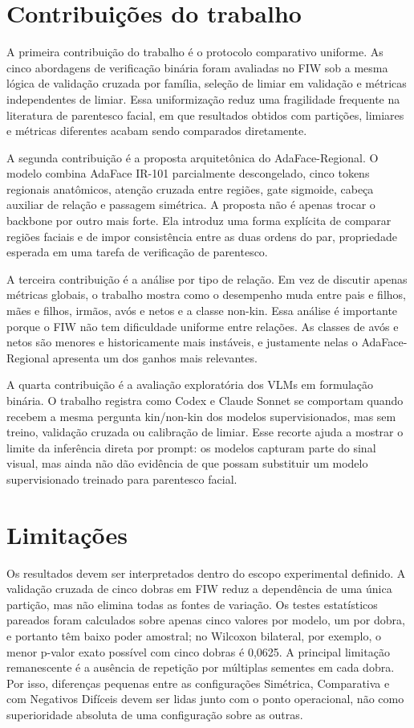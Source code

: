 \section{Contribuições do trabalho}

A primeira contribuição do trabalho é o protocolo comparativo uniforme. As cinco abordagens de verificação binária foram avaliadas no FIW sob a mesma lógica de validação cruzada por família, seleção de limiar em validação e métricas independentes de limiar. Essa uniformização reduz uma fragilidade frequente na literatura de parentesco facial, em que resultados obtidos com partições, limiares e métricas diferentes acabam sendo comparados diretamente.

A segunda contribuição é a proposta arquitetônica do AdaFace-Regional. O modelo combina AdaFace IR-101 parcialmente descongelado, cinco tokens regionais anatômicos, atenção cruzada entre regiões, gate sigmoide, cabeça auxiliar de relação e passagem simétrica. A proposta não é apenas trocar o backbone por outro mais forte. Ela introduz uma forma explícita de comparar regiões faciais e de impor consistência entre as duas ordens do par, propriedade esperada em uma tarefa de verificação de parentesco.

A terceira contribuição é a análise por tipo de relação. Em vez de discutir apenas métricas globais, o trabalho mostra como o desempenho muda entre pais e filhos, mães e filhos, irmãos, avós e netos e a classe non-kin. Essa análise é importante porque o FIW não tem dificuldade uniforme entre relações. As classes de avós e netos são menores e historicamente mais instáveis, e justamente nelas o AdaFace-Regional apresenta um dos ganhos mais relevantes.

A quarta contribuição é a avaliação exploratória dos VLMs em formulação binária. O trabalho registra como Codex e Claude Sonnet se comportam quando recebem a mesma pergunta kin/non-kin dos modelos supervisionados, mas sem treino, validação cruzada ou calibração de limiar. Esse recorte ajuda a mostrar o limite da inferência direta por prompt: os modelos capturam parte do sinal visual, mas ainda não dão evidência de que possam substituir um modelo supervisionado treinado para parentesco facial.

\section{Limitações}

Os resultados devem ser interpretados dentro do escopo experimental definido. A validação cruzada de cinco dobras em FIW reduz a dependência de uma única partição, mas não elimina todas as fontes de variação. Os testes estatísticos pareados foram calculados sobre apenas cinco valores por modelo, um por dobra, e portanto têm baixo poder amostral; no Wilcoxon bilateral, por exemplo, o menor p-valor exato possível com cinco dobras é 0,0625. A principal limitação remanescente é a ausência de repetição por múltiplas sementes em cada dobra. Por isso, diferenças pequenas entre as configurações Simétrica, Comparativa e com Negativos Difíceis devem ser lidas junto com o ponto operacional, não como superioridade absoluta de uma configuração sobre as outras.

